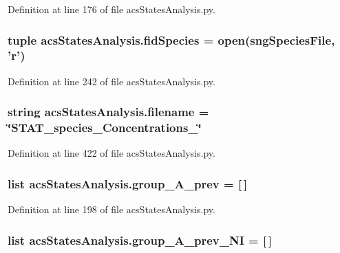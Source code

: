 Definition at line 176 of file acs\-States\-Analysis.\-py.

\hypertarget{a00130_afd34aa2ef2c410c2d71007bac0a121fd}{
\subsubsection[{fid\-Species}]{\setlength{\rightskip}{0pt plus 5cm}tuple acs\-States\-Analysis.\-fid\-Species = open(sng\-Species\-File, '{\bf r}')}}\label{a00130_afd34aa2ef2c410c2d71007bac0a121fd}


Definition at line 242 of file acs\-States\-Analysis.\-py.

\hypertarget{a00130_a69b59a10e5dc62a6e0d5325e9a27e5c6}{
\subsubsection[{filename}]{\setlength{\rightskip}{0pt plus 5cm}string acs\-States\-Analysis.\-filename = \char`\"{}S\-T\-A\-T\-\_\-species\-\_\-\-Concentrations\-\_\-\char`\"{}}}\label{a00130_a69b59a10e5dc62a6e0d5325e9a27e5c6}


Definition at line 422 of file acs\-States\-Analysis.\-py.

\hypertarget{a00130_a1dd2f2c85f697e454c99be1a157d6c17}{
\subsubsection[{group\-\_\-\-A\-\_\-prev}]{\setlength{\rightskip}{0pt plus 5cm}list acs\-States\-Analysis.\-group\-\_\-\-A\-\_\-prev = \mbox{[}$\,$\mbox{]}}}\label{a00130_a1dd2f2c85f697e454c99be1a157d6c17}


Definition at line 198 of file acs\-States\-Analysis.\-py.

\hypertarget{a00130_a4d77133a6a303d9486944707f3310cf8}{
\subsubsection[{group\-\_\-\-A\-\_\-prev\-\_\-\-N\-I}]{\setlength{\rightskip}{0pt plus 5cm}list acs\-States\-Analysis.\-group\-\_\-\-A\-\_\-prev\-\_\-\-N\-I = \mbox{[}$\,$\mbox{]}}}\label{a00130_a4d77133a6a303d9486944707f3310cf8}


